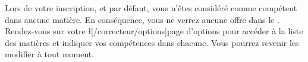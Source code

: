 ﻿Lors de votre inscription, et par défaut, vous n’êtes considéré comme compétent dans aucune matière. En conséquence, vous ne verrez aucune offre dans le . Rendez-vous sur votre \l[/correcteur/options]{page d’options} pour accéder à la liste des matières et indiquer vos compétences dans chacune. Vous pourrez revenir les modifier à tout moment.